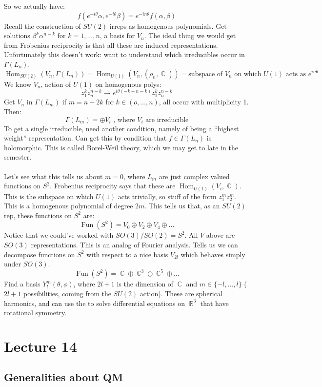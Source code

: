 \documentclass[12 pt]{article}
\DeclareMathOperator {\R} {\mathbb{R}}
\DeclareMathOperator {\C} {\mathbb{C}}
\DeclareMathOperator {\Hom} {Hom}
\DeclareMathOperator {\Fun} {Fun}
\theoremstyle{plain}
\theoremstyle{definition}
\theoremstyle{remark}
\begin{document}
So we actually have:
\[    f( e^{-i\theta} \alpha , e^{-i\theta} \beta) = e^{-in\theta} f(\alpha, \beta)   \]
Recall the construction of $SU(2)$ irreps as homogenous polynomials. Get solutions $\beta^k \alpha^{n-k}$ for $k = 1, \dots, n$, a basis for $V_n$. The ideal thing we would get from Frobenius reciprocity is that all these are induced representations. Unfortunately this doesn't work: want to understand which irreducibles occur in $\Gamma(L_n)$.
\[     \Hom_{SU(2)} (V_n, \Gamma(L_n))   = \Hom_{U(1)} ( V_n, (\rho_n, \C))  = \text{subspace of } V_n\text{ on which }U(1)\text{ acts as } e^{in\theta}    \]
We know $V_n$, action of $U(1)$ on homogenous polys:
\[       z_1^k z_n^{n-k} \to e^{i\theta(-k + n-k)}  z_1^k z_n^{n-k}     \]
Get $V_n$ in $\Gamma(L_m)$ if $m = n-2k$ for $k \in (o, \dots , n)$, all occur with multiplicity 1. Then:
\[     \Gamma(L_m) = \oplus V_i   \text{  , where }V_i\text{ are irreducible}    \]
To get a single irreducible, need another condition, namely of being a ``highest weight'' representation. Can get this by condition that $f\in \Gamma(L_n)$ is holomorphic. This is called Borel-Weil theory, which we may get to late in the semester.
\\
\\
Let's see what this tells us about $m=0$, where $L_m$ are just complex valued functions on $S^2$. Frobenius reciprocity says that these are $\Hom_{U(1)} (V_i, \C)$. This is the subspace on which $U(1)$ acts trivially, so stuff of the form $z_1^m z_2^m$. This is a homogenous polynomial of degree $2m$. This tells us that, as an $SU(2)$ rep, these functions on $S^2$ are:
\[    \Fun(S^2) = V_0 \oplus V_2 \oplus V_4 \oplus \dots      \]
Notice that we could've worked with $SO(3)/SO(2) = S^2$. All $V$ above are $SO(3)$ representations. This is an analog of Fourier analysis. Tells us we can decompose functions on $S^2$ with respect to a nice basis $V_{2l}$ which behaves simply under $SO(3)$.
\[    \Fun(S^2) = \C \oplus \C^3 \oplus \C^5 \oplus \dots    \]
Find a basis $Y_l^m(\theta, \phi)$, where $2l+1$ is the dimension of $\C$ and $m \in \{ -l , \dots , l\}$ ($2l+1$ possibilities, coming from the $SU(2)$ action). These are spherical harmonics, and can use the to solve differential equations on $\R^3$ that have rotational symmetry.


\section*{Lecture 14}
\subsection*{Generalities about QM}
\end{document}
